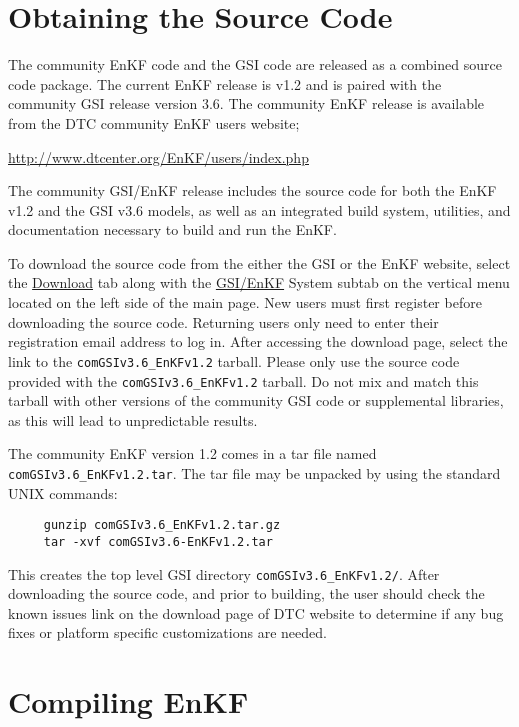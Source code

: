 \section{Obtaining the Source Code} \label{ch2_obtain_code}

The community EnKF code and the GSI code are released as a combined source code package. The current 
EnKF release is v1.2 and is paired with the community GSI release version 3.6.
The community EnKF release is available from the DTC community EnKF users website;

\url{http://www.dtcenter.org/EnKF/users/index.php}

The community GSI/EnKF release includes the source code for both the EnKF v1.2 and the GSI v3.6 models, as 
well as an integrated build system, utilities, and documentation necessary to build and run the EnKF.  

To download the source code from the either the GSI or the EnKF website, select the \underline{Download} tab 
along with the \underline{GSI/EnKF} System subtab on the vertical menu located on the left side of 
the main page. New users must first register before downloading the source code. Returning users only need 
to enter their registration email address to log in. After accessing the download page, select the link to the 
\verb|comGSIv3.6_EnKFv1.2| tarball. Please only use the source code provided with the 
\verb|comGSIv3.6_EnKFv1.2| tarball. Do not mix and match this tarball with other versions of the community 
GSI code or supplemental libraries, as this will lead to unpredictable results.

The community EnKF version 1.2 comes in a tar file named \verb|comGSIv3.6_EnKFv1.2.tar|. The tar file may 
be unpacked by using the standard UNIX commands:
\begin{verbatim}
     gunzip comGSIv3.6_EnKFv1.2.tar.gz 
     tar -xvf comGSIv3.6-EnKFv1.2.tar
\end{verbatim}
This creates the top level GSI directory \verb|comGSIv3.6_EnKFv1.2/|.
After downloading the source code, and prior to building, the user should check the known issues link on the 
download page of DTC website to determine if any bug fixes or platform specific customizations are needed.

\section{Compiling EnKF} \label{ch2_compiling}

